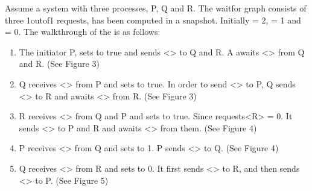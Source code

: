 \documentclass[letterpaper,10pt,english]{sphinxmanual}
\begin{document}
\sphinxAtStartPar
Assume a system with three processes, P, Q and R. The wait\sphinxhyphen{}for graph consists of three 1\sphinxhyphen{}out\sphinxhyphen{}of\sphinxhyphen{}1 requests, has been computed in a snapshot. Initially  = 2,  = 1 and  = 0.
The walkthrough of the {\hyperref[\detokenize{docs/BrachaToueg/algorithm:brachatouegdeadlockdetectionalgorithm}]{}} is as follows:
\begin{enumerate}
%
\item {} 
\sphinxAtStartPar
The initiator P, sets  to true and sends \textless{}\textgreater{} to Q and R. A awaits \textless{}\textgreater{} from Q and R. (See Figure 3)

\item {} 
\sphinxAtStartPar
Q receives \textless{}\textgreater{} from P and sets  to true. In order to send \textless{}\textgreater{} to P, Q sends \textless{}\textgreater{} to R and awaits \textless{}\textgreater{} from R. (See Figure 3)

\item {} 
\sphinxAtStartPar
R receives \textless{}\textgreater{} from Q and P and sets  to true. Since requests\textless{}R\textgreater{} = 0. It sends \textless{}\textgreater{} to P and R and awaits \textless{}\textgreater{} from them. (See Figure 4)

\item {} 
\sphinxAtStartPar
P receives \textless{}\textgreater{} from Q and sets  to 1. P sends \textless{}\textgreater{} to Q. (See Figure 4)

\item {} 
\sphinxAtStartPar
Q receives \textless{}\textgreater{} from R and sets  to 0. It first sends \textless{}\textgreater{} to R, and then sends \textless{}\textgreater{} to P. (See Figure 5)


\end{enumerate}
\end{document}
